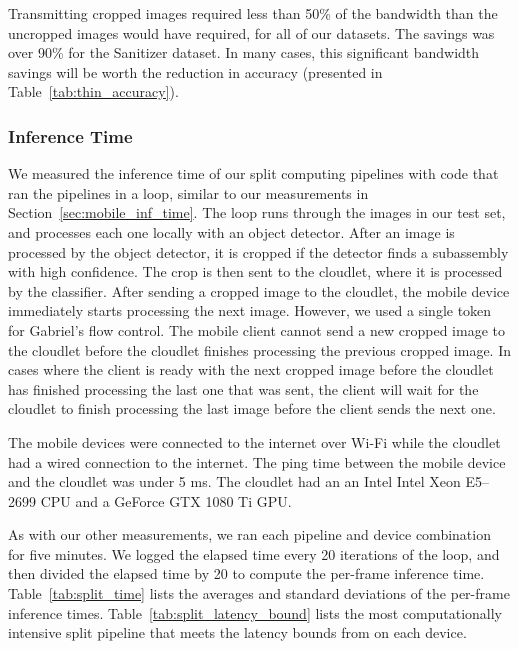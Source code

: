 Transmitting cropped images required less than 50\% of the bandwidth than
the uncropped images would have required, for all of our datasets.
The savings was over 90\% for the Sanitizer dataset.
In many cases, this significant bandwidth savings will be worth the reduction in
accuracy (presented in Table~\ref{tab:thin_accuracy}).

\subsubsection{Inference Time}

We measured the inference time of our split computing pipelines with code that
ran the pipelines in a loop, similar to our measurements in
Section~\ref{sec:mobile_inf_time}.
The loop runs through the images in our test set, and processes each one locally
with an object detector.
After an image is processed by the object detector, it is cropped if the
detector finds a subassembly with high confidence.
The crop is then sent to the cloudlet, where it is processed by the classifier.
After sending a cropped image to the cloudlet, the mobile device immediately
starts processing the next image.
However, we used a single token for Gabriel's flow control.
The mobile client cannot send a new cropped image to the cloudlet before the
cloudlet finishes processing the previous cropped image.
In cases where the client is ready with the next cropped image before the
cloudlet has finished processing the last one that was sent, the client will
wait for the cloudlet to finish processing the last image before the client
sends the next one.

The mobile devices were connected to the internet over Wi-Fi while the cloudlet
had a wired connection to the internet.
The ping time between the mobile device and the cloudlet was under 5 ms.
The cloudlet had an an Intel Intel Xeon E5–2699 CPU and a GeForce GTX 1080 Ti
GPU.

As with our other measurements, we ran each pipeline and device combination for
five minutes.
We logged the elapsed time every 20 iterations of the loop, and then divided the
elapsed time by 20 to compute the per-frame inference time.
Table~\ref{tab:split_time} lists the averages and standard deviations of the
per-frame inference times.
Table~\ref{tab:split_latency_bound} lists the most computationally intensive
split pipeline that meets the latency bounds from \citet{chen2017} on each
device.

